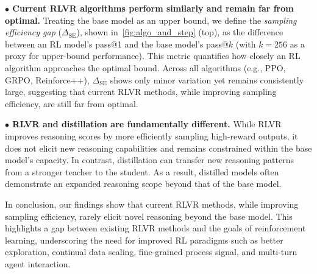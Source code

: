 \textbf{$\bullet$ Current RLVR algorithms perform similarly and remain far from optimal.}  
Treating the base model as an upper bound, we define the \textit{sampling efficiency gap} ($\Delta_{\text{SE}}$), shown in~\cref{fig:algo_and_step} (top), as the difference between an RL model's pass@1 and the base model's pass@$k$ (with $k=256$ as a proxy for upper-bound performance). This metric quantifies how closely an RL algorithm approaches the optimal bound.  
Across all algorithms (e.g., PPO, GRPO, Reinforce++), $\Delta_{\text{SE}}$ shows only minor variation yet remains consistently large, suggesting that current RLVR methods, while improving sampling efficiency, are still far from optimal.


\textbf{$\bullet$ RLVR and distillation are fundamentally different.}
While RLVR improves reasoning scores by more efficiently sampling high-reward outputs, it does not elicit new reasoning capabilities and remains constrained within the base model's capacity. 
In contrast, distillation can transfer new reasoning patterns from a stronger teacher to the student. As a result, distilled models often demonstrate an expanded reasoning scope beyond that of the base model.

In conclusion, our findings show that current RLVR methods, while improving sampling efficiency, rarely elicit novel reasoning beyond the base model. 
This highlights a gap between existing RLVR methods and the goals of reinforcement learning, underscoring the need for improved RL paradigms such as better exploration, continual data scaling, fine-grained process signal, and multi-turn agent interaction.
